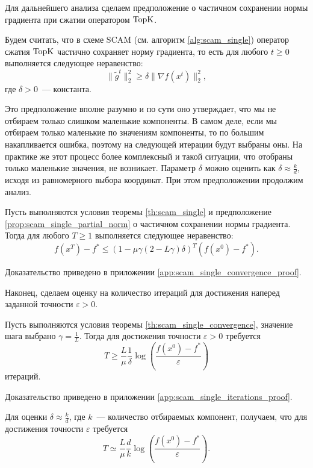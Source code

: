     Для дальнейшего анализа сделаем предположение о частичном сохранении нормы градиента при сжатии оператором $\operatorname{TopK}$.
    \begin{proposition}\label{prop:scam_single_partial_norm}
        Будем считать, что в схеме SCAM (см. алгоритм \ref{alg:scam_single}) оператор сжатия $\operatorname{TopK}$ частично сохраняет норму градиента, то есть для любого $t \geq 0$ выполняется следующее неравенство:
        \begin{equation}
            \|\tilde{g}^t\|_2^2 \geq \delta \|\nabla f(x^t)\|_2^2,
        \end{equation}
        где $\delta > 0$~--- константа.
    \end{proposition}
    Это предположение вполне разумно и по сути оно утверждает, что мы не отбираем только слишком маленькие компоненты. В самом деле, если мы отбираем только маленькие по значениям компоненты, то по большим накапливается ошибка, поэтому на следующей итерации будут выбраны оны. На практике же этот процесс более комплексный и такой ситуации, что отобраны только маленькие значения, не возникает. Параметр $\delta$ можно оценить как $\delta \approx \frac{k}{d}$, исходя из равномерного выбора координат. При этом предположении продолжим анализ.
    \begin{theorem}\label{th:scam_single_convergence}
        Пусть выполняются условия теоремы \ref{th:scam_single} и предположение \ref{prop:scam_single_partial_norm} о частичном сохранении нормы градиента. Тогда для любого $T \geq 1$ выполняется следующее неравенство:
        \begin{equation}
            f(x^T) - f^* \leq (1 - \mu \gamma (2 - L \gamma) \delta)^T (f(x^0) - f^*).
        \end{equation}
    \end{theorem}
    Доказательство приведено в приложении \ref{app:scam_single_convergence_proof}.

    Наконец, сделаем оценку на количество итераций для достижения наперед заданной точности $\varepsilon > 0$.
    \begin{corollary}\label{cor:scam_single_iterations}
        Пусть выполняются условия теоремы \ref{th:scam_single_convergence}, значение шага выбрано $\gamma = \frac{1}{L}$. Тогда для достижения точности $\varepsilon > 0$ требуется
        \begin{equation}
            T \geq \frac{L}{\mu} \frac{1}{\delta} \log\left(\frac{f(x^0) - f^*}{\varepsilon}\right)
        \end{equation}
        итераций.
    \end{corollary}
    Доказательство приведено в приложении \ref{app:scam_single_iterations_proof}.

    Для оценки $\delta \approx \frac{k}{d}$, где $k$~--- количество отбираемых компонент, получаем, что для достижения точности $\varepsilon$ требуется
    \begin{equation}
        T \simeq \frac{L}{\mu} \frac{d}{k} \log\left(\frac{f(x^0) - f^*}{\varepsilon}\right).
    \end{equation}
